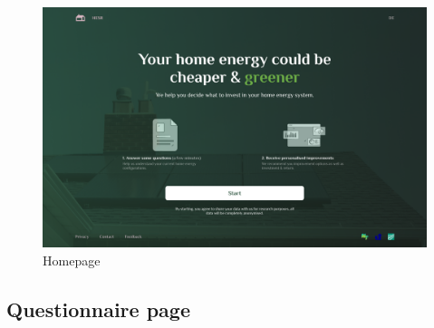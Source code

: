 \begin{figure}[h!]
  \centering
  \includegraphics[width=\textwidth]{Images/welcome.png}
  \caption{Homepage}
  \label{fig:homepage}
\end{figure}




\subsection*{Questionnaire page}

